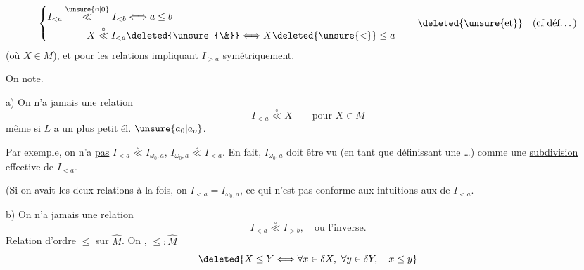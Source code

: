 \[
\left\{\begin{aligned}
I_{<a}\overset{\unsure{\circ|0}}{\ll}I_{<b}&\Longleftrightarrow a\leq b\\
X\overset{\circ}{\ll}I_{<a}&\deleted{\unsure{\&}}\Longleftrightarrow X\deleted{\unsure{<}}\leq a
\end{aligned}\right.
\qquad \deleted{\unsure{\text{et}}}\quad\text{(cf déf\ldots)}
\]
(où $X\in M$), et  pour  les relations  impliquant $I_{>a}$   symétriquement.

On note.

a) On n'a jamais une relation
\[
I_{<a}\overset{\circ}{\ll}X\qquad\text{pour }X\in M
\]
même si $L$ a un plus petit él. $\unsure{a_0|a_o}$.

Par exemple,  on n'a \uline{pas} $I_{<a}\overset{\circ}{\ll}I_{\omega_0,a}$,   $I_{\omega_0,a}\overset{\circ}{\ll}I_{<a}$. En fait, $I_{\omega_0,a}$ doit être vu (en tant que définissant une \ldots) comme une \uline{subdivision} effective de $I_{<a}$.

(Si on avait les deux relations à la fois, on  $I_{<a}=I_{\omega_0,a}$, ce qui n'est pas conforme aux intuitions  aux  de $I_{<a}$.

b) On n'a jamais une relation
\[
I_{<a}\overset{\circ}{\ll}I_{>b},\quad\text{ou l'inverse.}
\]
Relation d'ordre $\leq$ sur $\widehat M$. On ,    $\leq:\widehat M$ 
\[
\deleted{X\leq Y\Longleftrightarrow\forall x\in\delta X,\ \forall y\in\delta Y,\quad x\leq y}
\]
